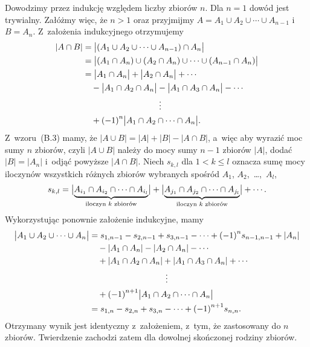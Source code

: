 \exercise %
Dowodzimy przez indukcję względem liczby zbiorów $n$. Dla $n=1$ dowód jest trywialny. Załóżmy więc, że $n>1$ oraz przyjmijmy $A=A_1\cup A_2\cup\cdots\cup A_{n-1}$ i~$B=A_n$. Z~założenia indukcyjnego otrzymujemy
\[
	\begin{split}
		|A\cap B| &= \bigl|(A_1\cup A_2\cup\cdots\cup A_{n-1})\cap A_n\bigr| \\
		&= \bigl|(A_1\cap A_n)\cup(A_2\cap A_n)\cup\cdots\cup(A_{n-1}\cap A_n)\bigr| \\
		&= \bigl|A_1\cap A_n\bigr|+\bigl|A_2\cap A_n\bigr|+\cdots{} \\
		&\quad {}-\bigl|A_1\cap A_2\cap A_n\bigr|-\bigl|A_1\cap A_3\cap A_n\bigr|-\cdots{} \\
		&\hspace{1.25in}\vdots \\
		&\quad {}+{(-1)}^n\bigl|A_1\cap A_2\cap\cdots\cap A_n\bigr|.
	\end{split}
\]
Z~wzoru~(B.3) mamy, że $|A\cup B|=|A|+|B|-|A\cap B|$, a~więc aby wyrazić moc sumy $n$ zbiorów, czyli $|A\cup B|$ należy do mocy sumy $n-1$ zbiorów $|A|$, dodać $|B|=|A_n|$ i~odjąć powyższe $|A\cap B|$. Niech $s_{k,l}$ dla $1<k\le l$ oznacza sumę mocy iloczynów wszystkich  różnych zbiorów wybranych spośród $A_1$, $A_2$,~\dots,~$A_l$,
\[
	s_{k,l} = \bigl|\underbrace{A_{i_1}\cap A_{i_2}\cap\cdots\cap A_{i_l}}_{\text{\scriptsize iloczyn $k$ zbiorów}}\bigr|+\bigl|\underbrace{A_{j_1}\cap A_{j_2}\cap\cdots\cap A_{j_l}}_{\text{\scriptsize iloczyn $k$ zbiorów}}\bigr|+\cdots{}.
\]
Wykorzystując ponownie założenie indukcyjne, mamy
\[
	\begin{split}
		\bigl|A_1\cup A_2\cup\cdots\cup A_n\bigr| &= s_{1,{n-1}}-s_{2,{n-1}}+s_{3,{n-1}}-\cdots+{(-1)}^ns_{{n-1},{n-1}}+|A_n| \\
		&\quad {}-|A_1\cap A_n|-|A_2\cap A_n|-\cdots{} \\
		&\quad {}+|A_1\cap A_2\cap A_n|+|A_1\cap A_3\cap A_n|+\cdots{} \\
		&\hspace{1.25in}\vdots \\
		&\quad {}+{(-1)}^{n+1}\bigl|A_1\cap A_2\cap\cdots\cap A_n\bigr| \\
		&= s_{1,n}-s_{2,n}+s_{3,n}-\cdots+{(-1)}^{n+1}s_{n,n}.
	\end{split}
\]
Otrzymany wynik jest identyczny z~założeniem, z~tym, że zastosowany do $n$ zbiorów. Twierdzenie zachodzi zatem dla dowolnej skończonej rodziny zbiorów.

\exercise %

